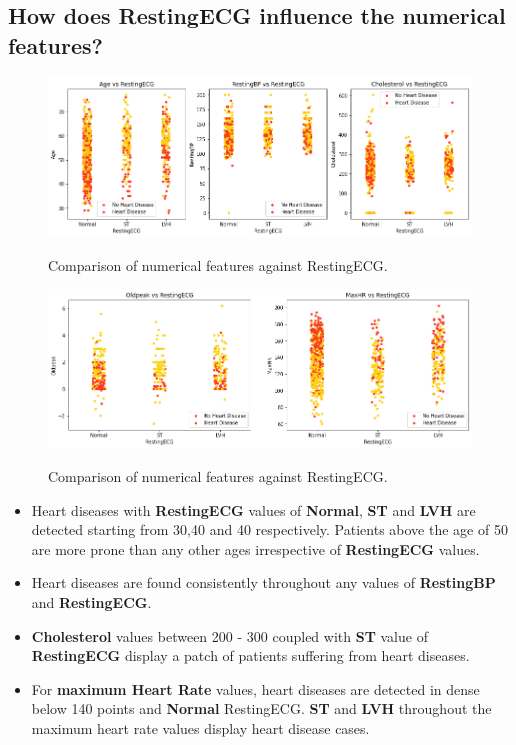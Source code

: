 \subsection{How does RestingECG influence the numerical features?}
\begin{figure}[!htpb]
    \centering
    \includegraphics[width=0.7\linewidth]{Figures/Outputs/resting-num.png}
    \label{Comparison between numerical features against RestingECG}
    \caption{Comparison of numerical features against RestingECG.}
\end{figure}
\begin{figure}[!htpb]
    \centering
    \includegraphics[width=0.7\linewidth]{Figures/Outputs/resting-num2.png}
    \label{Comparison between numerical features against RestingECG}
    \caption{Comparison of numerical features against RestingECG.}
\end{figure}
\begin{itemize}
    \item Heart diseases with \textbf{RestingECG} values of \textbf{Normal}, \textbf{ST} and \textbf{LVH} are detected starting from 30,40 and 40 respectively. Patients above the age of 50 are more prone than any other ages irrespective of \textbf{RestingECG} values.
    \item Heart diseases are found consistently throughout any values of \textbf{RestingBP} and \textbf{RestingECG}.
    \item \textbf{Cholesterol} values between 200 - 300 coupled with \textbf{ST} value of \textbf{RestingECG} display a patch of patients suffering from heart diseases. 
    \item For \textbf{maximum Heart Rate} values, heart diseases are detected in dense below 140 points and \textbf{Normal} RestingECG. \textbf{ST} and \textbf{LVH} throughout the maximum heart rate values display heart disease cases.
\end{itemize}

